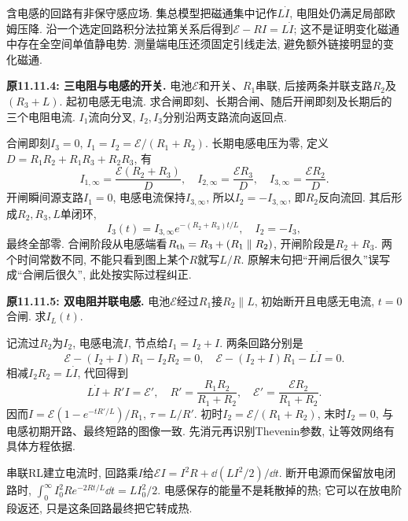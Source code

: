 \label{tb:rl-networks}
含电感的回路有非保守感应场. 集总模型把磁通集中记作$L\dot I$, 电阻处仍满足局部欧姆压降. 沿一个选定回路积分法拉第关系后得到$\mathcal E-RI=L\dot I$; 这不是证明变化磁通中存在全空间单值静电势. 测量端电压还须固定引线走法, 避免额外链接明显的变化磁通.

\begin{example}
\textbf{原11.11.4: 三电阻与电感的开关.} 电池$\mathcal E$和开关、$R_1$串联, 后接两条并联支路$R_2$及$(R_3+L)$. 起初电感无电流. 求合闸即刻、长期合闸、随后开闸即刻及长期后的三个电阻电流. $I_1$流向分叉, $I_2,I_3$分别沿两支路流向返回点.
\end{example}
\begin{solution}
合闸即刻$I_3=0$, $I_1=I_2=\mathcal E/(R_1+R_2)$. 长期电感电压为零, 定义$D=R_1R_2+R_1R_3+R_2R_3$, 有
\[I_{1,\infty}=\frac{\mathcal E(R_2+R_3)}D,\quad
I_{2,\infty}=\frac{\mathcal E R_3}D,\quad I_{3,\infty}=\frac{\mathcal E R_2}D.\]
开闸瞬间源支路$I_1=0$, 电感电流保持$I_{3,\infty}$, 所以$I_2=-I_{3,\infty}$, 即$R_2$反向流回. 其后形成$R_2,R_3,L$单闭环,
\[I_3(t)=I_{3,\infty}e^{-(R_2+R_3)t/L},\quad I_2=-I_3,\]
最终全部零. 合闸阶段从电感端看$R_{\rm th}=R_3+(R_1\parallel R_2)$, 开闸阶段是$R_2+R_3$. 两个时间常数不同, 不能只看到图上某个$R$就写$L/R$. 原解末句把“开闸后很久”误写成“合闸后很久”, 此处按实际过程纠正.
\end{solution}

\begin{example}
\textbf{原11.11.5: 双电阻并联电感.} 电池$\mathcal E$经过$R_1$接$R_2\parallel L$, 初始断开且电感无电流, $t=0$合闸. 求$I_L(t)$.
\end{example}
\begin{solution}
记流过$R_2$为$I_2$, 电感电流$I$, 节点给$I_1=I_2+I$. 两条回路分别是
\[\mathcal E-(I_2+I)R_1-I_2R_2=0,\quad
\mathcal E-(I_2+I)R_1-L\dot I=0.\]
相减$I_2R_2=L\dot I$, 代回得到
\[L\dot I+R'I=\mathcal E',\quad R'=\frac{R_1R_2}{R_1+R_2},\quad
\mathcal E'=\frac{\mathcal E R_2}{R_1+R_2}.\]
因而$I=\mathcal E(1-e^{-tR'/L})/R_1$, $\tau=L/R'$. 初时$I_2=\mathcal E/(R_1+R_2)$, 末时$I_2=0$, 与电感初期开路、最终短路的图像一致. 先消元再识别Thevenin参数, 让等效网络有具体方程依据.
\end{solution}

串联RL建立电流时, 回路乘$I$给$\mathcal EI=I^2R+\dd(LI^2/2)/\dd t$. 断开电源而保留放电闭路时, $\int_0^\infty I_0^2R e^{-2Rt/L}\dd t=LI_0^2/2$. 电感保存的能量不是耗散掉的热; 它可以在放电阶段返还, 只是这条回路最终把它转成热.

